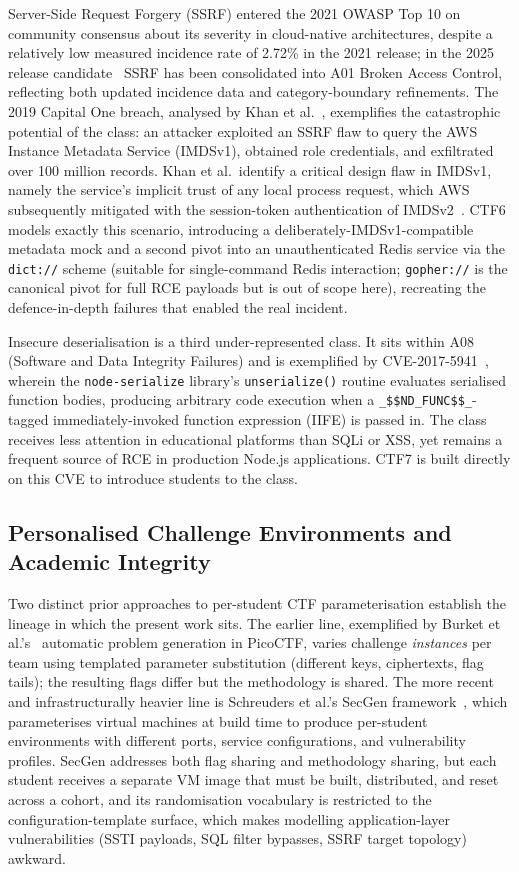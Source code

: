 Server-Side Request Forgery (SSRF) entered the 2021 OWASP Top
10 on community consensus about its severity in cloud-native
architectures, despite a relatively low measured incidence
rate of 2.72\% in the 2021 release; in the 2025 release
candidate~\cite{OWASP2025} SSRF has been consolidated into
A01 Broken Access Control, reflecting both updated incidence
data and category-boundary refinements. The 2019 Capital One
breach, analysed by
Khan et al.~\cite{khan2022}, exemplifies the catastrophic potential
of the class: an attacker exploited an SSRF flaw to query the AWS
Instance Metadata Service (IMDSv1), obtained role credentials, and
exfiltrated over 100 million records. Khan et al.\ identify a
critical design flaw in IMDSv1, namely the service's implicit trust
of any local process request, which AWS subsequently mitigated with the
session-token authentication of IMDSv2~\cite{IMDSv2}. CTF6 models
exactly this scenario, introducing a deliberately-IMDSv1-compatible
metadata mock and a second pivot into an unauthenticated Redis
service via the \texttt{dict://} scheme (suitable for
single-command Redis interaction; \texttt{gopher://} is the
canonical pivot for full RCE payloads but is out of scope
here), recreating the defence-in-depth failures that
enabled the real incident.

Insecure deserialisation is a third under-represented class. It
sits within A08 (Software and Data Integrity Failures) and is
exemplified by CVE-2017-5941~\cite{CVE20175941,NodeSerialize},
wherein the \texttt{node-serialize} library's
\texttt{unserialize()} routine evaluates serialised function
bodies, producing arbitrary code execution when a
\texttt{\_\$\$ND\_FUNC\$\$\_}-tagged immediately-invoked function
expression (IIFE) is passed in. The class receives less attention
in educational platforms than SQLi or XSS, yet remains a frequent
source of RCE in production Node.js applications. CTF7 is built
directly on this CVE to introduce students to the class.


\subsection{Personalised Challenge Environments and Academic Integrity}
Two distinct prior approaches to per-student CTF
parameterisation establish the lineage in which the present
work sits. The earlier line, exemplified by Burket et
al.'s~\cite{Burket2015} automatic problem generation in
PicoCTF, varies challenge \emph{instances} per team using
templated parameter substitution (different keys, ciphertexts,
flag tails); the resulting flags differ but the methodology is
shared. The more recent and infrastructurally heavier line is
Schreuders et al.'s SecGen framework~\cite{secgen2017}, which
parameterises virtual machines at build time to produce
per-student environments with different ports, service
configurations, and vulnerability profiles. SecGen addresses
both flag sharing and methodology sharing, but each student
receives a separate VM image that must be built, distributed,
and reset across a cohort, and its randomisation vocabulary is
restricted to the configuration-template surface, which makes
modelling application-layer vulnerabilities (SSTI payloads,
SQL filter bypasses, SSRF target topology) awkward.

